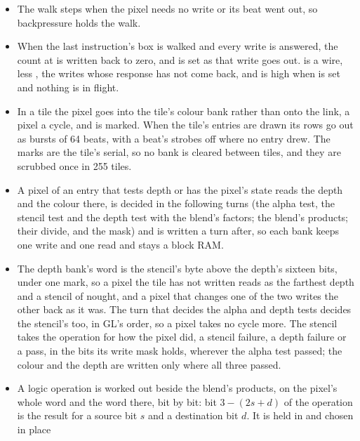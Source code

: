 \begin{itemize}
the next beat when  has room, whatever the pixel: the
alpha above the 24-bit colour, strobe  where  is
high and  where it is not, and  on the burst's
last beat. A triangle's pixels in a row are one run, so a burst wastes
beats only past the run's end.
\item The walk steps when the pixel needs no write or its beat went
out, so backpressure holds the walk.
\item When the last instruction's box is walked and every write is
answered, the count at  is written back to zero, and
 is set as that write goes out.  is a
wire,  less ,
the writes whose response has not come back, and  is high
when  is set and nothing is in flight.
\item In a tile the pixel goes into the tile's colour bank rather than
onto the link, a pixel a cycle, and is marked. When the tile's entries
are drawn its rows go out as bursts of 64 beats, with a beat's strobes
off where no entry drew. The marks are the tile's serial, so no bank
is cleared between tiles, and they are scrubbed once in 255 tiles.
\item A pixel of an entry that tests depth or has the pixel's state
reads the depth and the colour there, is decided in the following
turns (the alpha test, the stencil test and the depth test with the
blend's factors; the blend's products; their divide, and the mask) and
is written a turn after, so each bank keeps one write and one read and
stays a block RAM.
\item The depth bank's word is the stencil's byte above the depth's
sixteen bits, under one mark, so a pixel the tile has not written
reads as the farthest depth and a stencil of nought, and a pixel that
changes one of the two writes the other back as it was. The turn that
decides the alpha and depth tests decides the stencil's too, in GL's
order, so a pixel takes no cycle more. The stencil takes the operation
for how the pixel did, a stencil failure, a depth failure or a pass,
in the bits its write mask holds, wherever the alpha test passed; the
colour and the depth are written only where all three passed.
\item A logic operation is worked out beside the blend's products, on
the pixel's whole word and the word there, bit by bit: bit
$3 - (2s + d)$ of the operation is the result for a source bit $s$ and
a destination bit $d$. It is held in  and chosen in place

\end{itemize}
